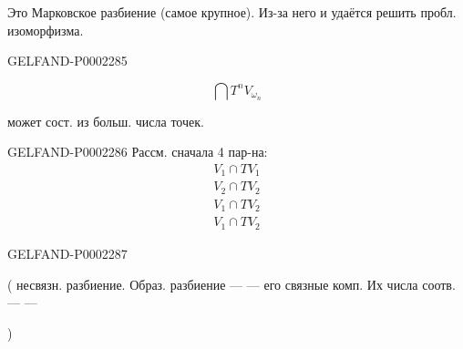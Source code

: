 Это Марковское разбиение (самое крупное).
Из-за него и удаётся решить пробл. изоморфизма.



\begin{GelfandAdjacentEvidence}{GELFAND-P000228}{5}

\begin{equation*}
 \bigcap T^n V_{\omega_n}
\end{equation*}


может сост. из больш. числа точек.
\end{GelfandAdjacentEvidence}

\begin{GelfandAdjacentEvidence}{GELFAND-P000228}{6}
Рассм. сначала 4 пар-на:
\begin{gather*}
 V_1\cap TV_1\\
 V_2\cap TV_2\\
 V_1\cap TV_2\\
 V_1\cap TV_2
\end{gather*}



\end{GelfandAdjacentEvidence}




\begin{GelfandAdjacentEvidence}{GELFAND-P000228}{7}

(
 несвязн. разбиение. Образ. разбиение —
— его связные комп. Их числа соотв. —
— 

)
\end{GelfandAdjacentEvidence}





